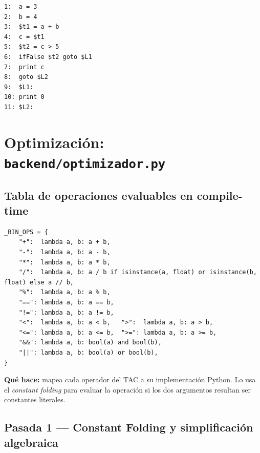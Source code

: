 \documentclass[11pt,a4paper]{article}
\begin{document}
\begin{lstlisting}[style=tac,basicstyle=\ttfamily\footnotesize\color{verdeTAC}]
1:  a = 3
2:  b = 4
3:  $t1 = a + b
4:  c = $t1
5:  $t2 = c > 5
6:  ifFalse $t2 goto $L1
7:  print c
8:  goto $L2
9:  $L1:
10: print 0
11: $L2:
\end{lstlisting}

\section{Optimización: \texttt{backend/optimizador.py}}

\subsection{Tabla de operaciones evaluables en compile-time}

\begin{lstlisting}[style=py]
_BIN_OPS = {
    "+":  lambda a, b: a + b,
    "-":  lambda a, b: a - b,
    "*":  lambda a, b: a * b,
    "/":  lambda a, b: a / b if isinstance(a, float) or isinstance(b, float) else a // b,
    "%":  lambda a, b: a % b,
    "==": lambda a, b: a == b,
    "!=": lambda a, b: a != b,
    "<":  lambda a, b: a < b,   ">":  lambda a, b: a > b,
    "<=": lambda a, b: a <= b,  ">=": lambda a, b: a >= b,
    "&&": lambda a, b: bool(a) and bool(b),
    "||": lambda a, b: bool(a) or bool(b),
}
\end{lstlisting}

\textbf{Qué hace:} mapea cada operador del TAC a su implementación Python.
Lo usa el \textit{constant folding} para evaluar la operación si los dos
argumentos resultan ser constantes literales.

\subsection{Pasada 1 --- Constant Folding y simplificación algebraica}
\end{document}
